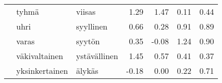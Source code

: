 \begin{tabular}{lllrrrr}
       & tyhmä & viisas &         1.29 &               1.47 &               0.11 &                     0.44 \\
       & uhri & syyllinen &         0.66 &               0.28 &               0.91 &                     0.89 \\
       & varas & syytön &         0.35 &              -0.08 &               1.24 &                     0.90 \\
       & väkivaltainen & ystävällinen &         1.45 &               0.57 &               0.41 &                     0.37 \\
       & yksinkertainen & älykäs &        -0.18 &               0.00 &               0.22 &                     0.71 \\
\bottomrule
\end{tabular}

